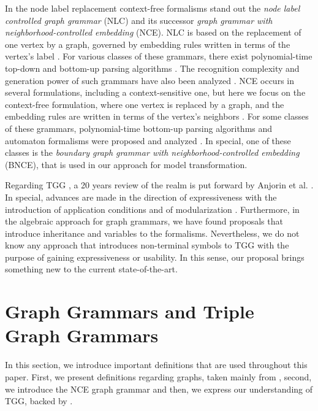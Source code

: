 \documentclass[runningheads]{llncs}
\begin{document}
In the node label replacement context-free formalisms stand out the \textit{node label controlled graph grammar} (NLC) and its successor \textit{graph grammar with neighborhood-controlled embedding} (NCE). NLC is based on the replacement of one vertex by a graph, governed by embedding rules written in terms of the vertex's label \cite{rozenberg1986boundary}. For various classes of these grammars, there exist polynomial-time top-down and bottom-up parsing algorithms \cite{flasinski1993parsing,flasinski2014characteristics,rozenberg1986boundary,wanke1991algorithms}. The recognition complexity and generation power of such grammars have also been analyzed \cite{flasinski1998power,kim2012structure}. NCE occurs in several formulations, including a context-sensitive one, but here we focus on the context-free formulation, where one vertex is replaced by a graph, and the embedding rules are written in terms of the vertex's neighbors \cite{janssens1982graph,skodinis1998neighborhood}. For some classes of these grammars, polynomial-time bottom-up parsing algorithms and automaton formalisms were proposed and analyzed \cite{kim2001efficient,brandenburg2005finite}. In special, one of these classes is the \textit{boundary graph grammar with neighborhood-controlled embedding} (BNCE), that is used in our approach for model transformation.

Regarding TGG \cite{schurr1994specification}, a 20 years review of the realm is put forward by Anjorin et al. \cite{anjorin201620}. In special, advances are made in the direction of expressiveness with the introduction of application conditions \cite{klar2010extended} and of modularization \cite{anjorin2014modularizing}. Furthermore, in the algebraic approach for graph grammars, we have found proposals that introduce inheritance \cite{bardohl2004integrating,hermann2008typed} and variables \cite{hoffmann2005graph} to the formalisms. Nevertheless, we do not know any approach that introduces non-terminal symbols to TGG with the purpose of gaining expressiveness or usability. In this sense, our proposal brings something new to the current state-of-the-art.

\section{Graph Grammars and Triple Graph Grammars}
\label{sec:gg-tgg}
In this section, we introduce important definitions that are used throughout this paper. First, we present definitions regarding graphs, taken mainly from \cite{rozenberg1986boundary}, second, we introduce the NCE graph grammar \cite{janssens1982graph,kim2001efficient} and then, we express our understanding of TGG, backed by \cite{schurr1994specification}.
\end{document}

